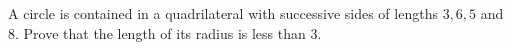 A circle is contained in a quadrilateral with successive sides of lengths $3,6,5$ and $8$. Prove that the length of its radius is less than $3$.